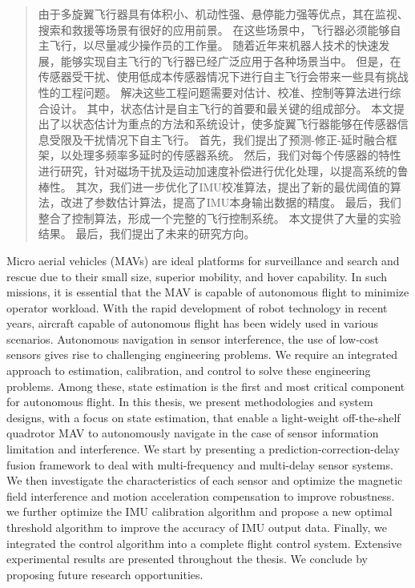 \documentclass[
  type=master
]{gdutthesis}
\begin{document}
\begin{abstract}
  由于多旋翼飞行器具有体积小、机动性强、悬停能力强等优点，其在监视、搜索和救援等场景有很好的应用前景。
  在这些场景中，飞行器必须能够自主飞行，以尽量减少操作员的工作量。
  随着近年来机器人技术的快速发展，能够实现自主飞行的飞行器已经广泛应用于各种场景当中。
  但是，在传感器受干扰、使用低成本传感器情况下进行自主飞行会带来一些具有挑战性的工程问题。
  解决这些工程问题需要对估计、校准、控制等算法进行综合设计。
  其中，状态估计是自主飞行的首要和最关键的组成部分。
  本文提出了以状态估计为重点的方法和系统设计，使多旋翼飞行器能够在传感器信息受限及干扰情况下自主飞行。
  首先，我们提出了预测-修正-延时融合框架，以处理多频率多延时的传感器系统。
  然后，我们对每个传感器的特性进行研究，针对磁场干扰及运动加速度补偿进行优化处理，以提高系统的鲁棒性。
  其次，我们进一步优化了IMU校准算法，提出了新的最优阈值的算法，改进了参数估计算法，提高了IMU本身输出数据的精度。
  最后，我们整合了控制算法，形成一个完整的飞行控制系统。
  本文提供了大量的实验结果。
  最后，我们提出了未来的研究方向。
\end{abstract}

\begin{abstract*}
  Micro aerial vehicles (MAVs) are ideal platforms for surveillance and search and rescue due to their small size, superior mobility, and hover capability.
  In such missions, it is essential that the MAV is capable of autonomous flight to minimize operator workload.
  With the rapid development of robot technology in recent years, aircraft capable of autonomous flight has been widely used in various scenarios.
  Autonomous navigation in sensor interference, the use of low-cost sensors gives rise to challenging engineering
  problems.
  We require an integrated approach to estimation, calibration, and control to solve these engineering problems.
  Among these, state estimation is the first and most critical component for autonomous flight.   
  In this thesis, we present methodologies and system designs, with a focus on state estimation, that enable a light-weight off-the-shelf quadrotor MAV to autonomously navigate in the case of sensor information limitation and interference.
  We start by presenting a prediction-correction-delay fusion framework to deal with multi-frequency and multi-delay sensor systems.
  We then investigate the characteristics of each sensor and optimize the magnetic field interference and motion acceleration compensation to improve robustness.
  we further optimize the IMU calibration algorithm and propose a new optimal threshold algorithm to improve the accuracy of IMU output data.
  Finally, we integrated the control algorithm into a complete flight control system.  	
  Extensive experimental results are presented throughout the thesis. 
  We conclude by proposing future research opportunities.
\end{abstract*}
\end{document}

